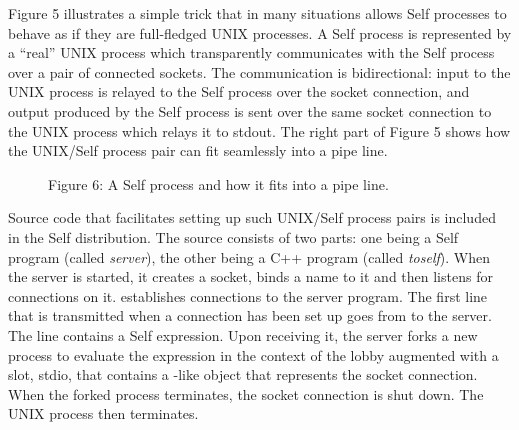 \documentclass[letterpaper,10pt,english]{sphinxmanual}
\begin{document}
Figure 5 illustrates a simple trick that in many situations allows Self processes to behave as if they
are full-fledged UNIX processes. A Self process is represented by a “real” UNIX process which
transparently communicates with the Self process over a pair of connected sockets. The communication
is bidirectional: input to the UNIX process is relayed to the Self process over the socket
connection, and output produced by the Self process is sent over the same socket connection to
the UNIX process which relays it to stdout. The right part of Figure 5 shows how the UNIX/Self
process pair can fit seamlessly into a pipe line.
\begin{figure}[htbp]\begin{flushleft}
\capstart

\caption{Figure 6: A Self process and how it fits into a pipe line.}\end{flushleft}\end{figure}

Source code that facilitates setting up such UNIX/Self process pairs is included in the Self distribution.
The source consists of two parts: one being a Self program (called \emph{server}), the other being
a C++ program (called \emph{toself}). When the server is started, it creates a socket, binds a name to it
and then listens for connections on it.  establishes connections to the server program. The
first line that is transmitted when a connection has been set up goes from  to the server. The
line contains a Self expression. Upon receiving it, the server forks a new process to evaluate the
expression in the context of the lobby augmented with a slot, stdio, that contains a -like
object that represents the socket connection. When the forked process terminates, the socket connection
is shut down. The  UNIX process then terminates.
\end{document}
